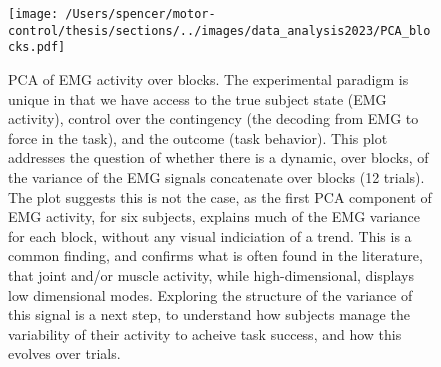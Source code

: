 \documentclass[
  a4paper,
]{article}
\begin{document}
\begin{figure}
\hypertarget{fig:behavior}{%
\centering
\texttt{[image: /Users/spencer/motor-control/thesis/sections/../images/data\_analysis2023/PCA\_blocks.pdf]}
\caption{PCA of EMG activity over blocks. The experimental paradigm is
unique in that we have access to the true subject state (EMG activity),
control over the contingency (the decoding from EMG to force in the
task), and the outcome (task behavior). This plot addresses the question
of whether there is a dynamic, over blocks, of the variance of the EMG
signals concatenate over blocks (12 trials). The plot suggests this is
not the case, as the first PCA component of EMG activity, for six
subjects, explains much of the EMG variance for each block, without any
visual indiciation of a trend. This is a common finding, and confirms
what is often found in the literature, that joint and/or muscle
activity, while high-dimensional, displays low dimensional modes.
Exploring the structure of the variance of this signal is a next step,
to understand how subjects manage the variability of their activity to
acheive task success, and how this evolves over
trials.}\label{fig:behavior}
}
\end{figure}
\end{document}
